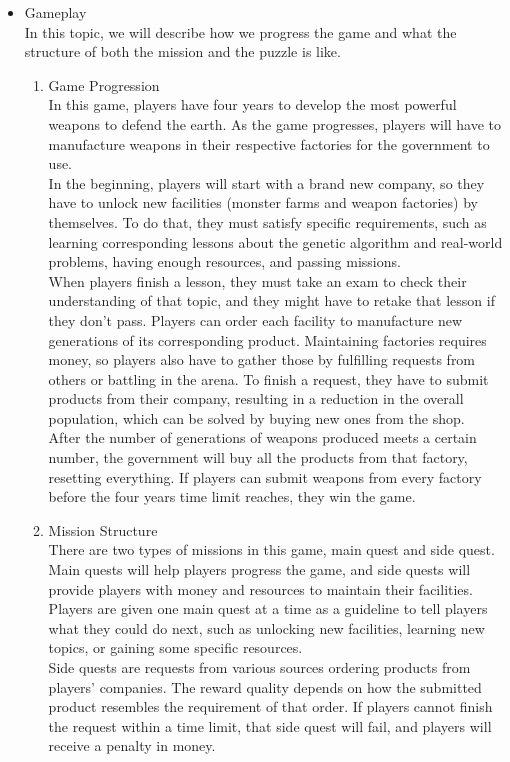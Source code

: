 \documentclass[12pt,oneside,openright,a4paper]{cpe-english-project}
\begin{document}
\begin{itemize}
\item Gameplay \\
In this topic, we will describe how we progress the game and what the structure of both the mission and the puzzle is like.
	\begin{enumerate}
	\item Game Progression \\
	In this game, players have four years to develop the most powerful weapons to defend the earth. As the game progresses, players will have to manufacture weapons in their respective factories for the government to use. \\
	In the beginning, players will start with a brand new company, so they have to unlock new facilities (monster farms and weapon factories) by themselves. To do that, they must satisfy specific requirements, such as learning corresponding lessons about the genetic algorithm and real-world problems, having enough resources, and passing missions. \\
	When players finish a lesson, they must take an exam to check their understanding of that topic, and they might have to retake that lesson if they don't pass. Players can order each facility to manufacture new generations of its corresponding product.
Maintaining factories requires money, so players also have to gather those by fulfilling requests from others or battling in the arena. To finish a request, they have to submit products from their company, resulting in a reduction in the overall population, which can be solved by buying new ones from the shop.\\
	After the number of generations of weapons produced meets a certain number, the government will buy all the products from that factory, resetting everything. If players can submit weapons from every factory before the four years time limit reaches, they win the game.

	\item Mission Structure \\
	There are two types of missions in this game, main quest and side quest. Main quests will help players progress the game, and side quests will provide players with money and resources to maintain their facilities. \\
	Players are given one main quest at a time as a guideline to tell players what they could do next, such as unlocking new facilities, learning new topics, or gaining some specific resources. \\
	Side quests are requests from various sources ordering products from players' companies. The reward quality depends on how the submitted product resembles the requirement of that order. If players cannot finish the request within a time limit, that side quest will fail, and players will receive a penalty in money.
	\end{enumerate}


\end{itemize}
\end{document}
